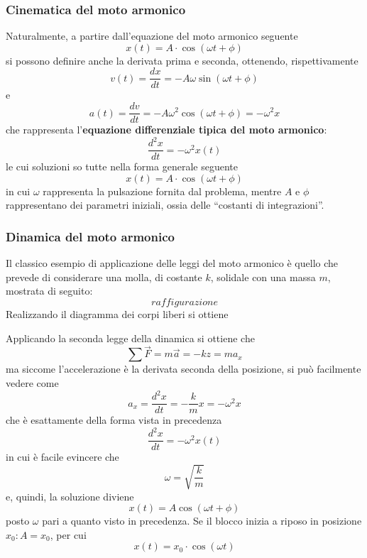 \documentclass[a4paper]{extarticle}
\newcommand{\quotes}[1]{``#1''}
\begin{document}
\vspace{1em}
\subsubsection{Cinematica del moto armonico}
Naturalmente, a partire dall'equazione del moto armonico seguente
\[\boxed{x(t) = A \cdot \cos(\omega t + \phi)}\]
si possono definire anche la derivata prima e seconda, ottenendo, rispettivamente
\[v(t) = \frac{dx}{dt} = - A \omega \sin(\omega t + \phi)\]
e
\[a(t) = \frac{dv}{dt} = - A \omega^2 \cos(\omega t + \phi) = - \omega^2 x\]
che rappresenta l'\textbf{equazione differenziale tipica del moto armonico}:
\[\boxed{\frac{d^2x}{dt} = - \omega^2 x(t)}\]
le cui soluzioni so tutte nella forma generale seguente
\[x(t) = A \cdot \cos(\omega t + \phi)\]
in cui $\omega$ rappresenta la pulsazione fornita dal problema, mentre $A$ e $\phi$ rappresentano dei parametri iniziali, ossia delle \quotes{costanti di integrazioni}.

\vspace{1em}
\subsubsection{Dinamica del moto armonico}
Il classico esempio di applicazione delle leggi del moto armonico è quello che prevede di considerare una molla, di costante $k$, solidale con una massa $m$, mostrata di seguito:
\[raffigurazione\]
Realizzando il diagramma dei corpi liberi si ottiene

\begin{figure}[H]
  \centering
\end{figure}

\noindent
Applicando la seconda legge della dinamica si ottiene che
\[\sum \vec F = m \vec a = -kz = m a_x\]
ma siccome l'accelerazione è la derivata seconda della posizione, si può facilmente vedere come
\[a_x = \frac{d^2 x}{dt} = - \frac{k}{m} x = - \omega^2 x\]
che è esattamente della forma vista in precedenza
\[\boxed{\frac{d^2x}{dt} = - \omega^2 x(t)}\]
in cui è facile evincere che
\[\boxed{\omega = \sqrt{\frac{k}{m}}}\]
e, quindi, la soluzione diviene
\[x(t) = A \cos(\omega t + \phi)\]
posto $\omega$ pari a quanto visto in precedenza. Se il blocco inizia a riposo in posizione $x_0 : A = x_0$, per cui
\[x(t) = x_0 \cdot \cos(\omega t)\]
\end{document}
